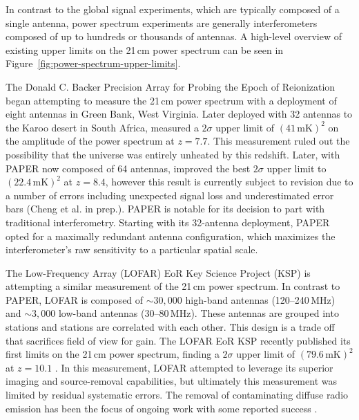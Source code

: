 \begin{bibunit}
In contrast to the global signal experiments, which are typically composed of a single antenna,
power spectrum experiments are generally interferometers composed of up to hundreds or thousands of
antennas. A high-level overview of existing upper limits on the 21\,cm power spectrum can be seen in
Figure~\ref{fig:power-spectrum-upper-limits}.

The Donald C. Backer Precision Array for Probing the Epoch of Reionization
\citep[PAPER;][]{2010AJ....139.1468P} began attempting to measure the 21\,cm power spectrum with a
deployment of eight antennas in Green Bank, West Virginia. Later deployed with 32 antennas to the
Karoo desert in South Africa, \citet{2014ApJ...788..106P} measured a $2\sigma$ upper limit of
$(41\,\text{mK})^2$ on the amplitude of the power spectrum at $z=7.7$. This measurement ruled out
the possibility that the universe was entirely unheated by this redshift.  Later, with PAPER now
composed of 64 antennas, \citet{2015ApJ...809...61A} improved the best $2\sigma$ upper limit to
$(22.4\,\text{mK})^2$ at $z=8.4$, however this result is currently subject to revision due to a
number of errors including unexpected signal loss and underestimated error bars (Cheng et al. in
prep.). PAPER is notable for its decision to part with traditional interferometry. Starting with its
32-antenna deployment, PAPER opted for a maximally redundant antenna configuration, which maximizes
the interferometer's raw sensitivity to a particular spatial scale.

The Low-Frequency Array (LOFAR) EoR Key Science Project (KSP) is attempting a similar measurement of
the 21\,cm power spectrum. In contrast to PAPER, LOFAR is composed of $\sim30,000$ high-band
antennas (120--240\,MHz) and $\sim3,000$ low-band antennas (30--80\,MHz). These antennas are grouped
into stations and stations are correlated with each other. This design is a trade off that
sacrifices field of view for gain. The LOFAR EoR KSP recently published its first limits on the
21\,cm power spectrum, finding a $2\sigma$ upper limit of $(79.6\,\text{mK})^2$ at $z=10.1$
\citep{2017ApJ...838...65P}. In this measurement, LOFAR attempted to leverage its superior imaging
and source-removal capabilities, but ultimately this measurement was limited by residual systematic
errors. The removal of contaminating diffuse radio emission has been the focus of ongoing work with
some reported success \citep{koopmans_2017}.


\end{bibunit}
